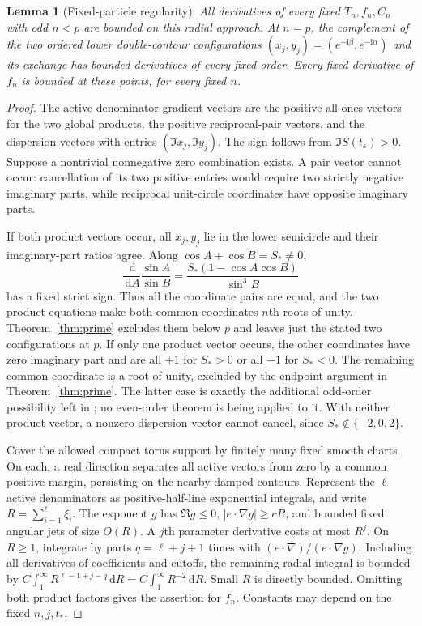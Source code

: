 \documentclass[11pt]{article}
\numberwithin{equation}{section}
\newtheorem{lemma}[theorem]{Lemma}
\theoremstyle{definition}
\newcommand{\dd}{\,\mathrm d}
\newcommand{\ii}{\mathrm i}
\newcommand{\eps}{\varepsilon}
\begin{document}
\begin{lemma}[Fixed-particle regularity]\label{lem:complement}
All derivatives of every fixed $T_n,f_n,C_n$ with odd $n<p$
are bounded on this radial approach. At $n=p$, the complement
of the two ordered lower double-contour configurations
$(x_j,y_j)=(e^{-\ii\beta},e^{-\ii\alpha})$ and its exchange
has bounded derivatives of every fixed order. Every fixed
derivative of $f_n$ is bounded at these points, for every fixed $n$.
\end{lemma}
\begin{proof}
The active denominator-gradient vectors are the positive all-ones
vectors for the two global products, the positive reciprocal-pair
vectors, and the dispersion vectors with entries
$(\Im x_j,\Im y_j)$. The sign follows from $\Im S(t_\eps)>0$.
Suppose a nontrivial nonnegative zero combination exists. A pair
vector cannot occur: cancellation of its two positive entries would
require two strictly negative imaginary parts, while reciprocal
unit-circle coordinates have opposite imaginary parts.

If both product vectors occur, all $x_j,y_j$ lie in the lower
semicircle and their imaginary-part ratios agree. Along
$\cos A+\cos B=S_*\ne0$,
\[
 \frac{\dd}{\dd A}\frac{\sin A}{\sin B}
 =\frac{S_*(1-\cos A\cos B)}{\sin^3 B}
\]
has a fixed strict sign. Thus all the coordinate pairs are equal,
and the two product equations make both common coordinates $n$th
roots of unity. Theorem~\ref{thm:prime} excludes them below $p$
and leaves just the stated two configurations at $p$.
If only one product vector occurs, the other coordinates have zero
imaginary part and are all $+1$ for $S_*>0$ or all $-1$ for
$S_*<0$. The remaining common coordinate is a root of unity,
excluded by the endpoint argument in Theorem~\ref{thm:prime}.
The latter case is exactly the additional odd-order possibility
left in \cite[footnote~5]{TW2014}; no even-order theorem is being
applied to it. With neither product vector, a nonzero dispersion
vector cannot cancel, since $S_*\notin\{-2,0,2\}$.

Cover the allowed compact torus support by finitely many fixed
smooth charts. On each, a real direction separates all active
vectors from zero by a common positive margin, persisting on the
nearby damped contours. Represent the $\ell$ active denominators
as positive-half-line exponential integrals, and write
$R=\sum_{i=1}^{\ell}\xi_i$. The exponent $g$ has
$\Re g\le0$, $|e\cdot\nabla g|\ge cR$, and bounded fixed
angular jets of size $O(R)$. A $j$th parameter derivative costs
at most $R^j$. On $R\ge1$, integrate by parts
$q=\ell+j+1$ times with $(e\cdot\nabla)/(e\cdot\nabla g)$.
Including all derivatives of coefficients and cutoffs, the
remaining radial integral is bounded by
$C\int_1^\infty R^{\ell-1+j-q}\dd R=C\int_1^\infty R^{-2}\dd R$.
Small $R$ is directly bounded. Omitting both product factors gives
the assertion for $f_n$. Constants may depend on the fixed $n,j,t_*$.
\end{proof}
\end{document}
